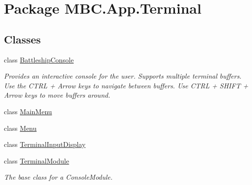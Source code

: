 \hypertarget{namespace_m_b_c_1_1_app_1_1_terminal}{\section{Package M\-B\-C.\-App.\-Terminal}
\label{namespace_m_b_c_1_1_app_1_1_terminal}
}
\subsection*{Classes}
\begin{DoxyCompactItemize}
\item 
class \hyperlink{class_m_b_c_1_1_app_1_1_terminal_1_1_battleship_console}{Battleship\-Console}
\begin{DoxyCompactList}\small\item\em Provides an interactive console for the user. Supports multiple terminal buffers. Use the C\-T\-R\-L + Arrow keys to navigate between buffers. Use C\-T\-R\-L + S\-H\-I\-F\-T + Arrow keys to move buffers around.\end{DoxyCompactList}\item 
class \hyperlink{class_m_b_c_1_1_app_1_1_terminal_1_1_main_menu}{Main\-Menu}
\item 
class \hyperlink{class_m_b_c_1_1_app_1_1_terminal_1_1_menu}{Menu}
\item 
class \hyperlink{class_m_b_c_1_1_app_1_1_terminal_1_1_terminal_input_display}{Terminal\-Input\-Display}
\item 
class \hyperlink{class_m_b_c_1_1_app_1_1_terminal_1_1_terminal_module}{Terminal\-Module}
\begin{DoxyCompactList}\small\item\em The base class for a Console\-Module.\end{DoxyCompactList}\end{DoxyCompactItemize}
